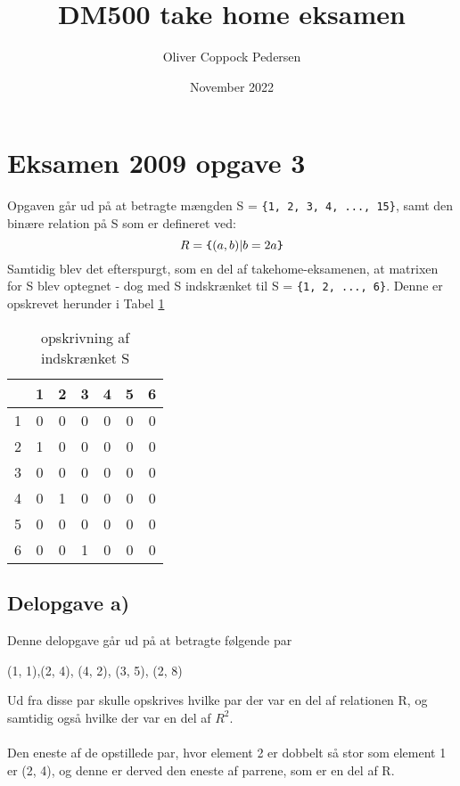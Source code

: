 \documentclass{article}
\title{DM500 take home eksamen}
\author{Oliver Coppock Pedersen}
\date{November 2022}
\begin{document}
\maketitle

\section{Eksamen 2009 opgave 3}
Opgaven går ud på at betragte mængden S = \verb|{1, 2, 3, 4, ..., 15}|, samt den binære relation på S som er defineret ved:
\begin{equation}
    R = \verb|{|(a, b) | b = 2a\verb|}|
\end{equation}
Samtidig blev det efterspurgt, som en del af takehome-eksamenen, at matrixen for S blev optegnet - dog med S indskrænket til S = \verb|{1, 2, ..., 6}|. Denne er opskrevet herunder i Tabel \ref{tabel:S}

\begin{table}[h!]
\centering
    
\begin{tabular}{|c||c|c|c|c|c|c|}
    \hline
     & 1 & 2 & 3 & 4 & 5 & 6 \\
     \hline
    \hline
    1 & 0& 0& 0& 0& 0& 0 \\
    \hline
    2 & 1& 0& 0& 0& 0& 0\\
    \hline
    3 & 0& 0& 0& 0& 0& 0\\
    \hline
    4 & 0& 1& 0& 0& 0& 0\\
    \hline
    5 & 0& 0& 0& 0& 0& 0\\
    \hline
    6 & 0& 0& 1& 0& 0& 0\\
    \hline
    
\end{tabular}
\caption{opskrivning af indskrænket S}
\label{tabel:S}
\end{table}
\subsection{Delopgave a)}
Denne delopgave går ud på at betragte følgende par 
\begin{center}
    (1, 1),(2, 4), (4, 2), (3, 5), (2, 8)
\end{center}
Ud fra disse par skulle opskrives hvilke par der var en del af relationen R, og samtidig også hvilke der var en del af $R^2$. \\ \\

Den eneste af de opstillede par, hvor element 2 er dobbelt så stor som element 1 er (2, 4), og denne er derved den eneste af parrene, som er en del af R. \\ \\
\end{document}
